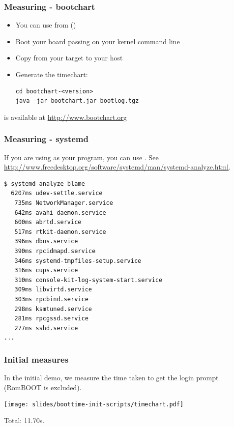 \begin{frame}[fragile]
\frametitle{Measuring - bootchart}
\begin{itemize}
	\item You can use  from 
	      ()
	\item Boot your board passing  on your
	      kernel command line
	\item Copy  from your target to your host
	\item Generate the timechart:
\begin{block}{}
\begin{verbatim}
cd bootchart-<version>
java -jar bootchart.jar bootlog.tgz
\end{verbatim}
\end{block}
\end{itemize}
 is available at \url{http://www.bootchart.org}
\end{frame}

\begin{frame}[fragile]
\frametitle{Measuring - systemd}
If you are using  as your  program, you can use
. See
\url{http://www.freedesktop.org/software/systemd/man/systemd-analyze.html}.\\
\begin{block}{}
\tiny
\begin{verbatim}
$ systemd-analyze blame
  6207ms udev-settle.service
   735ms NetworkManager.service
   642ms avahi-daemon.service
   600ms abrtd.service
   517ms rtkit-daemon.service
   396ms dbus.service
   390ms rpcidmapd.service
   346ms systemd-tmpfiles-setup.service
   316ms cups.service
   310ms console-kit-log-system-start.service
   309ms libvirtd.service
   303ms rpcbind.service
   298ms ksmtuned.service
   281ms rpcgssd.service
   277ms sshd.service
...
\end{verbatim}
\end{block}
\end{frame}

\begin{frame}
\frametitle{Initial measures}
In the initial demo, we measure the time taken to get the login
prompt (RomBOOT is excluded).
\begin{center}
    \texttt{[image: slides/boottime-init-scripts/timechart.pdf]}
\end{center}
Total: 11.70s.
\end{frame}

